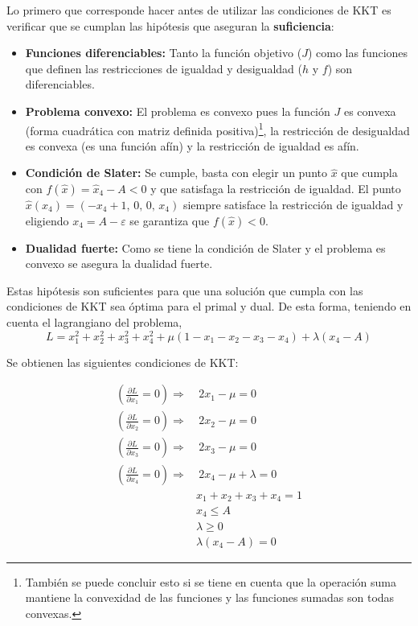 Lo primero que corresponde hacer antes de utilizar las condiciones de KKT es verificar que se cumplan las hipótesis que aseguran la \textbf{suficiencia}:

\begin{itemize}
  \item \textbf{Funciones diferenciables:} Tanto la función objetivo (\(J\)) como las funciones que definen las restricciones de igualdad y desigualdad (\(h\) y \(f\)) son diferenciables.

  \item \textbf{Problema convexo:} El problema es convexo pues la función \(J\) es convexa (forma cuadrática con matriz definida positiva)\footnote{También se puede concluir esto si se tiene en cuenta que la operación suma mantiene la convexidad de las funciones y las funciones sumadas son todas convexas.}, la restricción de desigualdad es convexa (es una función afín) y la restricción de igualdad es afín.

  \item \textbf{Condición de Slater:} Se cumple, basta con elegir un punto \(\hat{x}\) que cumpla con \(f(\hat{x}) = \hat{x}_4 - A < 0\) y que satisfaga la restricción de igualdad. El punto \(\hat{x}(x_4) = (-x_4+1,\, 0,\, 0,\, x_4)\) siempre satisface la restricción de igualdad y eligiendo \(x_4 = A - \varepsilon\) se garantiza que \(f(\hat{x}) < 0\).

  \item \textbf{Dualidad fuerte:} Como se tiene la condición de Slater y el problema es convexo se asegura la dualidad fuerte.
\end{itemize}

Estas hipótesis son suficientes para que una solución que cumpla con las condiciones de KKT sea óptima para el primal y dual. De esta forma, teniendo en cuenta el lagrangiano del problema,
\[
L = x_1^2 + x_2^2 + x_3^2 + x_4^2 + \mu (1 - x_1 - x_2 - x_3 - x_4) + \lambda (x_4 - A)
\]

Se obtienen las siguientes condiciones de KKT:

\begin{align*}
  \left( \frac{\partial L}{\partial x_1} = 0\right) \Rightarrow &\:2x_1 - \mu = 0 \\
  \left( \frac{\partial L}{\partial x_2} = 0 \right)\Rightarrow &\:2x_2 - \mu = 0 \\
  \left( \frac{\partial L}{\partial x_3} = 0 \right) \Rightarrow &\: 2x_3 - \mu = 0 \\
  \left( \frac{\partial L}{\partial x_4} = 0 \right) \Rightarrow &\: 2x_4 - \mu + \lambda = 0 \\
  &x_1 + x_2 + x_3 + x_4 = 1 \\
  &x_4 \leq A \\
  &\lambda \geq 0 \\
  &\lambda (x_4 - A) = 0
\end{align*}


